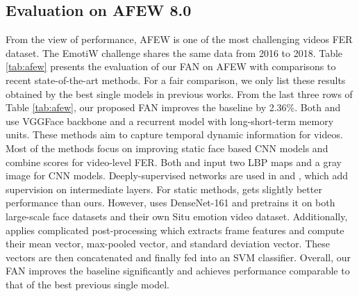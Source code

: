 \documentclass{article}
\begin{document}
\subsection{Evaluation on  AFEW 8.0}
From the view of performance, AFEW is one of the most challenging videos FER dataset. The EmotiW challenge shares the same data from 2016 to 2018. 
Table \ref{tab:afew} presents the evaluation of our FAN on AFEW with comparisons to recent state-of-the-art methods. For a fair comparison, we only list these results obtained by the best single models in previous works. From the last three rows of Table \ref{tab:afew}, our proposed FAN improves the baseline by 2.36\%. 
Both \cite{fan2016video} and \cite{Vielzeuf2017Temporal} use VGGFace backbone and a recurrent model with long-short-term memory units. These methods aim to capture temporal dynamic information for videos.
Most of the methods focus on improving static face based CNN models and combine scores for video-level FER. Both \cite{yao2016holonet} and \cite{Hu2017Learning} input two LBP maps and a gray image for CNN models. Deeply-supervised networks are used in \cite{Hu2017Learning} and \cite{fan2018video}, which add supervision on intermediate layers.
For static methods, \cite{liu2018multi} gets slightly better performance than ours. However, \cite{liu2018multi} uses DenseNet-161 and pretrains it on both large-scale face datasets and their own Situ emotion video dataset. Additionally, \cite{liu2018multi} applies complicated post-processing which extracts frame features and compute their mean vector, max-pooled vector, and standard deviation vector. These vectors are then concatenated and finally fed into an SVM classifier.
Overall, our FAN improves the baseline significantly and achieves performance comparable to that of the best previous single model.
\end{document}
